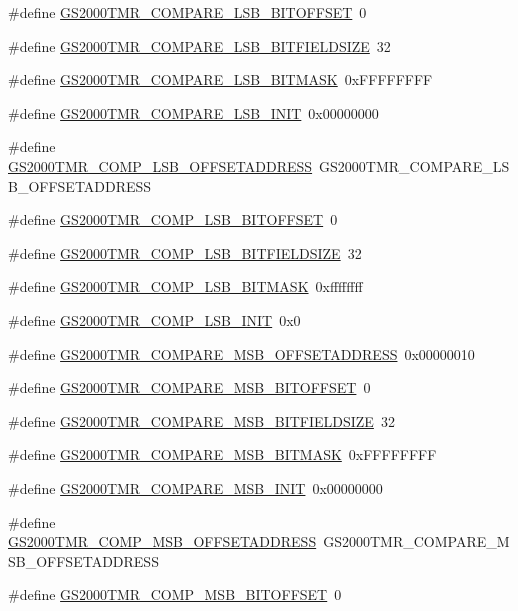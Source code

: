 \begin{DoxyCompactItemize}
\item 
\#define \hyperlink{a00556_aafbe297e31a587a0abcaecc32037a694}{GS2000TMR\_\-COMPARE\_\-LSB\_\-BITOFFSET}~0
\item 
\#define \hyperlink{a00556_a31509c23e7ceefc839fd556a783c570a}{GS2000TMR\_\-COMPARE\_\-LSB\_\-BITFIELDSIZE}~32
\item 
\#define \hyperlink{a00556_a54deeb76f7ca108afe125b4c9906dbd6}{GS2000TMR\_\-COMPARE\_\-LSB\_\-BITMASK}~0xFFFFFFFF
\item 
\#define \hyperlink{a00556_a4b6c01a8b29ce62749f552441aec4807}{GS2000TMR\_\-COMPARE\_\-LSB\_\-INIT}~0x00000000
\item 
\#define \hyperlink{a00556_a20f9ffd542e7153f17c9010b314f4497}{GS2000TMR\_\-COMP\_\-LSB\_\-OFFSETADDRESS}~GS2000TMR\_\-COMPARE\_\-LSB\_\-OFFSETADDRESS
\item 
\#define \hyperlink{a00556_abdf3a5a57cf75e07b130658660758a28}{GS2000TMR\_\-COMP\_\-LSB\_\-BITOFFSET}~0
\item 
\#define \hyperlink{a00556_a1a46ff1f5e1335f816c7bd8f44f2d756}{GS2000TMR\_\-COMP\_\-LSB\_\-BITFIELDSIZE}~32
\item 
\#define \hyperlink{a00556_a2c97f9325bf535aaa2d242851deb60f2}{GS2000TMR\_\-COMP\_\-LSB\_\-BITMASK}~0xffffffff
\item 
\#define \hyperlink{a00556_a68913fc8cfc32f0176ac2d3b6be81d2b}{GS2000TMR\_\-COMP\_\-LSB\_\-INIT}~0x0
\item 
\#define \hyperlink{a00556_a63c07dcfce2f41a7e8edc9f2ce87f7f2}{GS2000TMR\_\-COMPARE\_\-MSB\_\-OFFSETADDRESS}~0x00000010
\item 
\#define \hyperlink{a00556_a1534193ac2c9b954456d5a9c22af6f01}{GS2000TMR\_\-COMPARE\_\-MSB\_\-BITOFFSET}~0
\item 
\#define \hyperlink{a00556_a4f0f12a4cf0cd47d40787e632b494069}{GS2000TMR\_\-COMPARE\_\-MSB\_\-BITFIELDSIZE}~32
\item 
\#define \hyperlink{a00556_a8f0bd62784e4263bb7808c044f1cb2ed}{GS2000TMR\_\-COMPARE\_\-MSB\_\-BITMASK}~0xFFFFFFFF
\item 
\#define \hyperlink{a00556_aeb655ff38af7f6e0fe25380c5b734e6d}{GS2000TMR\_\-COMPARE\_\-MSB\_\-INIT}~0x00000000
\item 
\#define \hyperlink{a00556_ac11cdae1bd9a10aa2ff648ba5f6626a6}{GS2000TMR\_\-COMP\_\-MSB\_\-OFFSETADDRESS}~GS2000TMR\_\-COMPARE\_\-MSB\_\-OFFSETADDRESS
\item 
\#define \hyperlink{a00556_a7d3f6961c6dd1a76c8f280d89e9efd00}{GS2000TMR\_\-COMP\_\-MSB\_\-BITOFFSET}~0
\item 

\end{DoxyCompactItemize}
